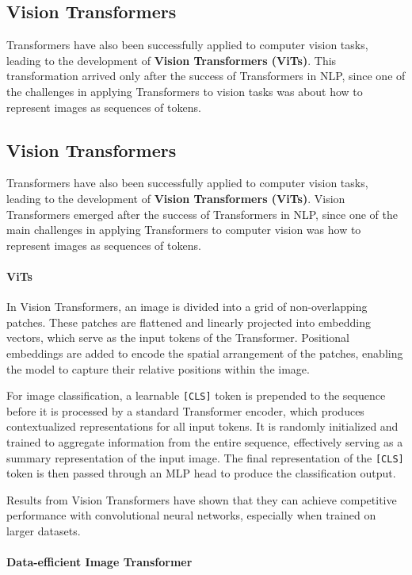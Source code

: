 \subsection{Vision Transformers}
Transformers have also been successfully applied to computer vision tasks, leading to the development of \textbf{Vision Transformers (ViTs)}.
This transformation arrived only after the success of Transformers in NLP, since one of the challenges in applying Transformers to vision tasks was about how to represent images as sequences of tokens.

\subsection{Vision Transformers}

Transformers have also been successfully applied to computer vision tasks, leading to the development of \textbf{Vision Transformers (ViTs)}.
Vision Transformers emerged after the success of Transformers in NLP, since one of the main challenges in applying Transformers to computer vision was how to represent images as sequences of tokens.

\paragraph{ViTs}

In Vision Transformers, an image is divided into a grid of non-overlapping patches. These patches are flattened and linearly projected into embedding vectors, which serve as the input tokens of the Transformer.
Positional embeddings are added to encode the spatial arrangement of the patches, enabling the model to capture their relative positions within the image.

For image classification, a learnable \texttt{[CLS]} token is prepended to the sequence before it is processed by a standard Transformer encoder, which produces contextualized representations for all input tokens.
It is randomly initialized and trained to aggregate information from the entire sequence, effectively serving as a summary representation of the input image.
The final representation of the \texttt{[CLS]} token is then passed through an MLP head to produce the classification output.

Results from Vision Transformers have shown that they can achieve competitive performance with convolutional neural networks, especially when trained on larger datasets.

\paragraph{Data-efficient Image Transformer}

